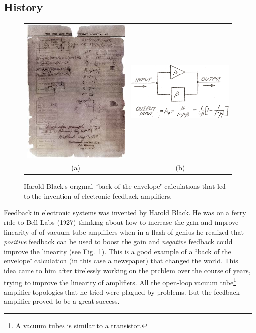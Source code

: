 \subsection{History}
\begin{figure}[tb]
\centering
\begin{tabular}{cc}
\includegraphics[width=.5\columnwidth]{image_1.jpg} &
\includegraphics[width=.4\columnwidth]{image_2.png}\\
(a) & (b)\\
\end{tabular}
\caption{Harold Black's original ``back of the envelope" calculations that led to the invention of electronic feedback amplifiers.}
\label{fig:image_1.jpg}
\end{figure}
Feedback in electronic systems was invented by Harold Black.  He was on a ferry ride to Bell Labs (1927) thinking about how to increase the gain and improve linearity of of vacuum tube amplifiers when in a flash of genius he realized that \textit{positive} feedback can be used to boost the gain and \textit{negative} feedback could improve the linearity (see Fig.~\ref{fig:image_1.jpg}).  This is a good example of a ``back of the envelope" calculation (in this case a newspaper) that changed the world.  This idea came to him after tirelessly working on the problem over the course of years, trying to improve the linearity of amplifiers.  All the open-loop vacuum tube\footnote{A vacuum tubes is similar to a transistor.} amplifier topologies that he tried were plagued by problems.  But the feedback amplifier proved to be a great success.
